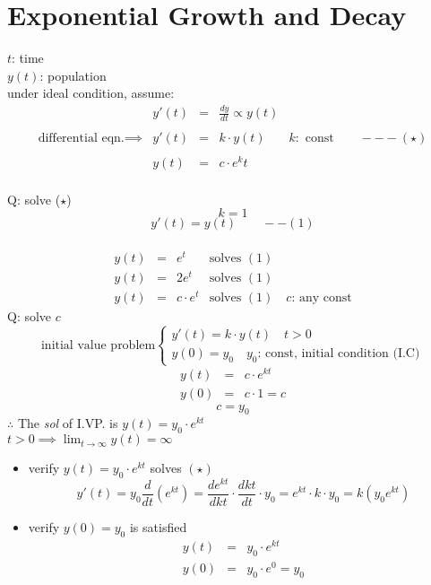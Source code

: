 \section{Exponential Growth and Decay}
$t$: time\\
$y(t)$: population\\
under ideal condition, assume:
$$\begin{array}{rrcll}
& y'(t) & = & \displaystyle \frac{dy}{dt} \propto y(t)\\\\
\text{differential eqn.} \implies & y'(t) & = & \displaystyle k \cdot y(t) & k: \text{ const} \quad \quad ---(\star)\\\\
& y(t) & = & c \cdot e^kt
\end{array}$$\\
Q: solve ($\star$)\\
$$k=1$$ 
$$y'(t) = y(t) \quad \quad --(1)$$\\
$$\begin{array}{rcll}
y(t) & = & e^t & \text{solves } (1)\\
y(t) & = & 2e^t & \text{solves } (1)\\
y(t) & = & c \cdot e^t & \text{solves } (1) \quad c\text{: any const}
\end{array}$$
Q: solve $c$\\
$$
\text{initial value problem}
\left\{ \begin{array}{ll}
           y'(t) = k \cdot y(t) \quad t>0 \\
           y(0) = y_0 \quad y_0\text{: const, initial condition (I.C)}
        \end{array} \right.
$$
$$\begin{array}{rcl}
y(t) & = & c \cdot e^{kt}\\
y(0) & =& c \cdot 1 = c
\end{array}$$
$$c = y_0$$
$\therefore$ The \textit{sol} of I.VP. is $y(t)=y_0 \cdot e^{kt}$\\
$t>0 \implies \displaystyle \lim_{t \to \infty} y(t) = \infty$
\begin{itemize}
\item verify $y(t) = y_0 \cdot e^{kt}$ solves $(\star)$\\
$$\displaystyle y'(t) = y_0 \frac{d}{dt}(e^{kt}) = \frac{d e^{kt}}{dkt} \cdot \frac{dkt}{dt} \cdot y_0 = e^{kt} \cdot k \cdot y_0 = k(y_0 e^{kt})$$
\item verify $y(0) = y_0$ is satisfied\\
$$\begin{array}{rcl}
y(t) & = & y_0 \cdot e^{kt}\\
y(0) & = & y_0 \cdot e^0 = y_0
\end{array}$$
\end{itemize}

